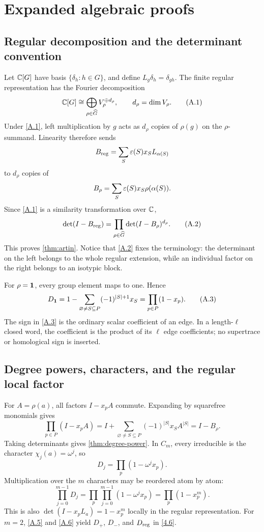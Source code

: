 \section{Expanded algebraic proofs}
\label{app:proofs}

\subsection{Regular decomposition and the determinant convention}
\label{app:proof-artin}

Let \(\mathbb C[G]\) have basis \(\{\delta_h:h\in G\}\), and define
\(L_g\delta_h=\delta_{gh}\).  The finite regular representation has the
Fourier decomposition
\[
\mathbb C[G]\cong\bigoplus_{\rho\in\widehat G}V_\rho^{\oplus d_\rho},
\qquad d_\rho=\dim V_\rho.
\tag{A.1}\label{A.1}
\]
Under \eqref{A.1}, left multiplication by \(g\) acts as \(d_\rho\) copies of
\(\rho(g)\) on the \(\rho\)-summand.  Linearity therefore sends
\[
B_{\mathrm{reg}}=\sum_S\varepsilon(S)x_SL_{\alpha(S)}
\]
to \(d_\rho\) copies of
\[
B_\rho=\sum_S\varepsilon(S)x_S\rho(\alpha(S)).
\]
Since \eqref{A.1} is a similarity transformation over \(\mathbb C\),
\[
\det(I-B_{\mathrm{reg}})
=\prod_{\rho\in\widehat G}\det(I-B_\rho)^{d_\rho}.
\tag{A.2}\label{A.2}
\]
This proves \cref{thm:artin}.  Notice that \eqref{A.2} fixes the terminology:
the determinant on the left belongs to the whole regular extension, while an
individual factor on the right belongs to an isotypic block.

For \(\rho=\mathbf 1\), every group element maps to one.  Hence
\[
D_{\mathbf 1}
=1-\sum_{\varnothing\ne S\subseteq P}(-1)^{|S|+1}x_S
=\prod_{p\in P}(1-x_p).
\tag{A.3}\label{A.3}
\]
The sign in \eqref{A.3} is the ordinary scalar coefficient of an edge.  In a
length-\(\ell\) closed word, the coefficient is the product of its
\(\ell\) edge coefficients; no supertrace or homological sign is inserted.

\subsection{Degree powers, characters, and the regular local factor}

For \(A=\rho(a)\), all factors \(I-x_pA\) commute.  Expanding by squarefree
monomials gives
\[
\prod_{p\in P}(I-x_pA)
=I+\sum_{\varnothing\ne S\subseteq P}(-1)^{|S|}x_SA^{|S|}
=I-B_\rho.
\tag{A.4}\label{A.4}
\]
Taking determinants gives \cref{thm:degree-power}.  In \(C_m\), every
irreducible is the character \(\chi_j(a)=\omega^j\), so
\[
D_j=\prod_p(1-\omega^jx_p).
\tag{A.5}\label{A.5}
\]
Multiplication over the \(m\) characters may be reordered atom by atom:
\[
\prod_{j=0}^{m-1}D_j
=\prod_p\prod_{j=0}^{m-1}(1-\omega^jx_p)
=\prod_p(1-x_p^m).
\tag{A.6}\label{A.6}
\]
This is also \(\det(I-x_pL_a)=1-x_p^m\) locally in the regular
representation.  For \(m=2\), \eqref{A.5} and \eqref{A.6} yield
\(D_+\), \(D_-\), and \(D_{\mathrm{reg}}\) in \eqref{4.6}.

